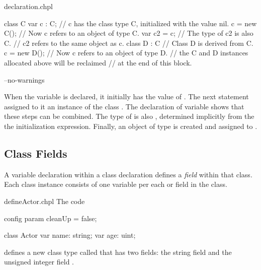 \begin{chapelexample}{declaration.chpl}
\begin{chapel}
class C { }
var c : C;      // c has the class type C, initialized with the value nil.
c = new C();    // Now c refers to an object of type C.
var c2 = c;     // The type of c2 is also C.
                // c2 refers to the same object as c.
class D : C {}  // Class D is derived from C.
c = new D();    // Now c refers to an object of type D.
// the C and D instances allocated above will be reclaimed
// at the end of this block.
\end{chapel}
\begin{chapelcompopts}
--no-warnings
\end{chapelcompopts}
\begin{chapeloutput}
\end{chapeloutput}
When the variable  is declared, it initially has the value
of .  The next statement assigned to it an instance of the
class .  The declaration of variable  shows that these steps can
be combined.  The type of  is also , determined implicitly from
the the initialization expression.  Finally, an object of type  is created and
assigned to .
\end{chapelexample}

\subsection{Class Fields}
\label{Class_Fields}

A variable declaration within a class declaration defines
a \emph{field} within that class.
Each class instance consists of one variable per each
 or  field in the class.

\begin{chapelexample}{defineActor.chpl}
The code
\begin{chapelpre}
config param cleanUp = false;
\end{chapelpre}
\begin{chapel}
class Actor {
  var name: string;
  var age: uint;
}
\end{chapel}
\begin{chapeloutput}
\end{chapeloutput}
defines a new class type called  that has two fields: the
string field  and the unsigned integer field .
\end{chapelexample}

